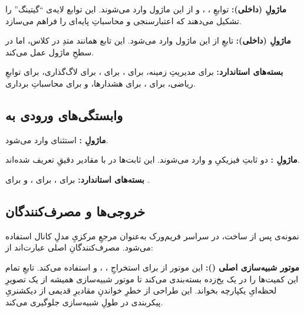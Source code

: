 \textbf{ماژولِ  (داخلی):} توابعِ ، ،  و  از این ماژول وارد می‌شوند. این توابع لایه‌ی ``گیتینگ''  را تشکیل می‌دهند که اعتبارسنجی و محاسباتِ پایه‌ای را فراهم می‌سازد.

\textbf{ماژولِ  (داخلی):} تابعِ  از این ماژول وارد می‌شود. این تابع همانند متدِ  در کلاس، اما در سطحِ ماژول عمل می‌کند.

\textbf{بسته‌های استاندارد:}  برای مدیریتِ زمینه،  برای ،  برای ،  برای لاگ‌گذاری،  برای توابعِ ریاضی،  برای ،  برای هشدارها، و  برای محاسباتِ برداری.

\subsection{وابستگی‌های ورودی به }

\textbf{ماژولِ :} استثنای  وارد می‌شود.

\textbf{ماژولِ :} دو ثابتِ فیزیکیِ  و  وارد می‌شوند. این ثابت‌ها در  با مقادیر دقیقِ  تعریف شده‌اند.

\textbf{بسته‌های استاندارد:}  برای ،  برای ، و  برای .

\subsection{خروجی‌ها و مصرف‌کنندگان}

نمونه‌ی  پس از ساخت، در سراسر فریم‌ورک به‌عنوان مرجعِ مرکزیِ مدلِ کانال استفاده می‌شود. مصرف‌کنندگانِ اصلی عبارت‌اند از:

\textbf{موتور شبیه‌سازی اصلی ():} این موتور از  برای استخراجِ ، ،  و  استفاده می‌کند. تابعِ  تمام این کمیت‌ها را در یک  یخ‌زده بسته‌بندی می‌کند تا موتور شبیه‌سازی همیشه از یک تصویرِ لحظه‌ایِ یکپارچه بخواند. این طراحی از خطرِ خواندنِ مقادیرِ قدیمی از دیکشنریِ پیکربندی در طولِ شبیه‌سازی جلوگیری می‌کند.

